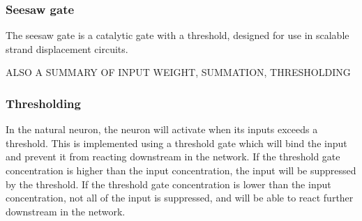 
\subsubsection{Seesaw gate}

The seesaw gate is a catalytic gate with a threshold, designed for use in scalable strand displacement circuits.


ALSO A SUMMARY OF INPUT WEIGHT, SUMMATION, THRESHOLDING

\subsubsection{Thresholding}
In the natural neuron, the neuron will activate when its inputs exceeds a threshold. This is implemented using a threshold gate which will bind the input and prevent it from reacting downstream in the network. If the threshold gate concentration is higher than the input concentration, the input will be suppressed by the threshold. If the threshold gate concentration is lower than the input concentration, not all of the input is suppressed, and will be able to react further downstream in the network.



